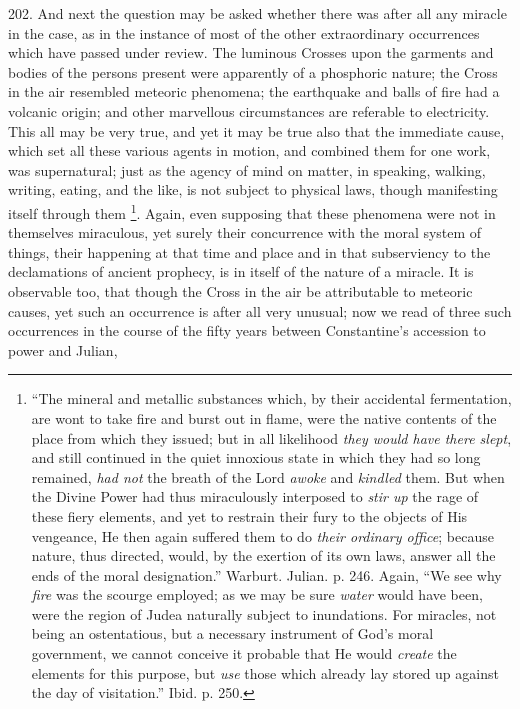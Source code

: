 202.
And next the question may be asked whether there was after all any
miracle in the case, as in the instance of most of the other
extraordinary occurrences which have passed under review. The luminous
Crosses upon the garments and bodies of the persons present were
apparently of a phosphoric nature; the Cross in the air resembled
meteoric phenomena; the earthquake and balls of fire had a volcanic
origin; and other marvellous circumstances are referable to
electricity. This all may be very true, and yet it may be true also
that the immediate cause, which set all these various agents in
motion, and combined them for one work, was supernatural; just as the
agency of mind on matter, in speaking, walking, writing, eating, and
the like, is not subject to physical laws, though manifesting itself
through them \footnote{``The mineral and metallic substances which, by their accidental
fermentation, are wont to take fire and burst out in flame, were the
native contents of the place from which they issued; but in all
likelihood \emph{they would have there slept}, and still continued in
the quiet innoxious state in which they had so long remained, \emph{had
not} the breath of the Lord \emph{awoke} and \emph{kindled} them.
But when the Divine Power had thus miraculously interposed to \emph{stir
up} the rage of these fiery elements, and yet to restrain their
fury to the objects of His vengeance, He then again suffered them to
do \emph{their ordinary office}; because nature, thus directed, would,
by the exertion of its own laws, answer all the ends of the moral
designation.'' Warburt. Julian. p. 246. Again, ``We see why \emph{fire}
was the scourge employed; as we may be sure \emph{water} would have
been, were the region of Judea naturally subject to inundations. For
miracles, not being an ostentatious, but a necessary instrument of God's
moral government, we cannot conceive it probable that He would \emph{create}
the elements for this purpose, but \emph{use} those which already lay
stored up against the day of visitation.'' Ibid. p. 250.}. Again, even
supposing that these phenomena were not in themselves miraculous, yet
surely their concurrence with the moral system of things, their
happening at that time and place and in that subserviency to the
declamations of ancient prophecy, is in itself of the nature of a
miracle. It is observable too, that though the Cross in the air be
attributable to meteoric causes, yet such an occurrence is after all
very unusual; now we read of three such occurrences in the course of
the fifty years between Constantine's accession to power and Julian,
